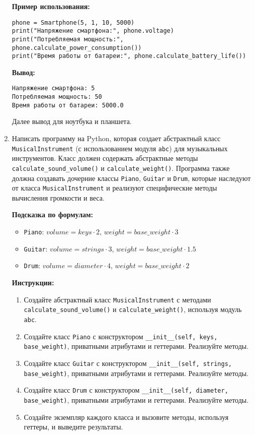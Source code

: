 \begin{enumerate}
\textbf{Пример использования:}
\begin{verbatim}
phone = Smartphone(5, 1, 10, 5000)
print("Напряжение смартфона:", phone.voltage)
print("Потребляемая мощность:", phone.calculate_power_consumption())
print("Время работы от батареи:", phone.calculate_battery_life())
\end{verbatim}

\textbf{Вывод:}
\begin{verbatim}
Напряжение смартфона: 5
Потребляемая мощность: 50
Время работы от батареи: 5000.0
\end{verbatim}

Далее вывод для ноутбука и планшета.

\item
Написать программу на Python, которая создает абстрактный класс \texttt{MusicalInstrument} (с использованием модуля \texttt{abc}) для музыкальных инструментов. 
Класс должен содержать абстрактные методы \texttt{calculate\_sound\_volume()} и \texttt{calculate\_weight()}. 
Программа также должна создавать дочерние классы \texttt{Piano}, \texttt{Guitar} и \texttt{Drum}, 
которые наследуют от класса \texttt{MusicalInstrument} и реализуют специфические методы вычисления громкости и веса.

\textbf{Подсказка по формулам:}
\begin{itemize}
    \item \texttt{Piano}: $volume = keys \cdot 2$, $weight = base\_weight \cdot 3$
    \item \texttt{Guitar}: $volume = strings \cdot 3$, $weight = base\_weight \cdot 1.5$
    \item \texttt{Drum}: $volume = diameter \cdot 4$, $weight = base\_weight \cdot 2$
\end{itemize}

\textbf{Инструкции:}
\begin{enumerate}
    \item Создайте абстрактный класс \texttt{MusicalInstrument} с методами \texttt{calculate\_sound\_volume()} и \texttt{calculate\_weight()}, используя модуль \texttt{abc}.
    \item Создайте класс \texttt{Piano} с конструктором \texttt{\_\_init\_\_(self, keys, base\_weight)}, приватными атрибутами и геттерами. Реализуйте методы.
    \item Создайте класс \texttt{Guitar} с конструктором \texttt{\_\_init\_\_(self, strings, base\_weight)}, приватными атрибутами и геттерами. Реализуйте методы.
    \item Создайте класс \texttt{Drum} с конструктором \texttt{\_\_init\_\_(self, diameter, base\_weight)}, приватными атрибутами и геттерами. Реализуйте методы.
    \item Создайте экземпляр каждого класса и вызовите методы, используя геттеры, и выведите результаты.
\end{enumerate}


\end{enumerate}
